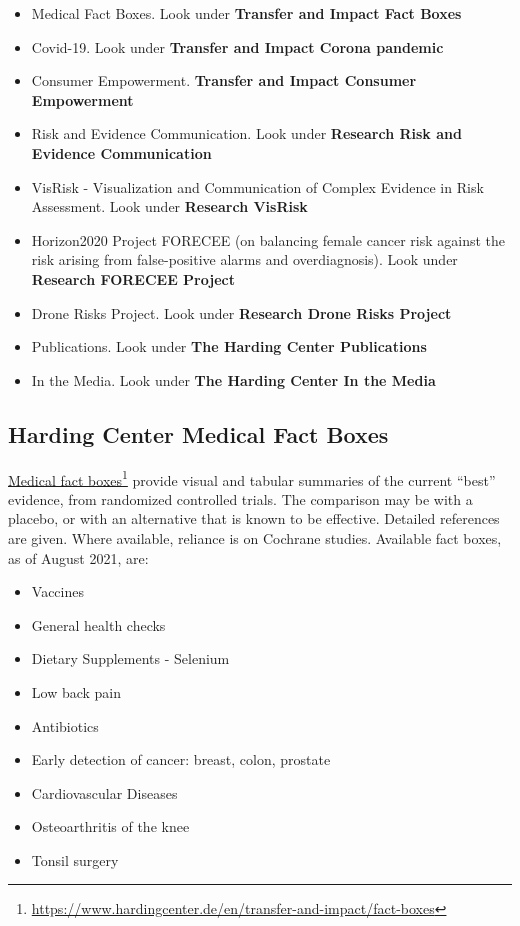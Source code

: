 \documentclass[
  10pt,
  b5paper]{book}
\providecommand{\tightlist}{%
  \setlength{\itemsep}{0pt}\setlength{\parskip}{0pt}}
\begin{document}
\begin{itemize}
\tightlist
\item
  Medical Fact Boxes. Look under \textbf{Transfer and Impact \textbar{} Fact Boxes}
\item
  Covid-19. Look under \textbf{Transfer and Impact \textbar{} Corona pandemic}
\item
  Consumer Empowerment. \textbf{Transfer and Impact \textbar{} Consumer Empowerment}
\item
  Risk and Evidence Communication. Look under \textbf{Research \textbar{} Risk and Evidence Communication}
\item
  VisRisk - Visualization and Communication of Complex Evidence in Risk Assessment. Look under \textbf{Research \textbar{} VisRisk}
\item
  Horizon2020 Project FORECEE (on balancing female cancer risk against
  the risk arising from false-positive alarms and overdiagnosis).
  Look under \textbf{Research \textbar{} FORECEE Project}
\item
  Drone Risks Project. Look under \textbf{Research \textbar{} Drone Risks Project}
\item
  Publications. Look under \textbf{The Harding Center \textbar{} Publications}
\item
  In the Media. Look under \textbf{The Harding Center \textbar{} In the Media}
\end{itemize}

\hypertarget{harding-center-medical-fact-boxes}{%
\subsection*{Harding Center Medical Fact Boxes}\label{harding-center-medical-fact-boxes}}

\href{https://www.hardingcenter.de/en/transfer-and-impact/fact-boxes}{Medical fact boxes}\footnote{\url{https://www.hardingcenter.de/en/transfer-and-impact/fact-boxes}} provide visual and tabular summaries of the current
``best'' evidence, from randomized controlled trials. The comparison
may be with a placebo, or with an alternative that is known to be
effective. Detailed references are given. Where available, reliance
is on Cochrane studies. Available fact boxes, as of August 2021, are:

\begin{itemize}
\tightlist
\item
  Vaccines
\item
  General health checks
\item
  Dietary Supplements - Selenium
\item
  Low back pain
\item
  Antibiotics
\item
  Early detection of cancer: breast, colon, prostate
\item
  Cardiovascular Diseases
\item
  Osteoarthritis of the knee
\item
  Tonsil surgery
\end{itemize}
\end{document}

